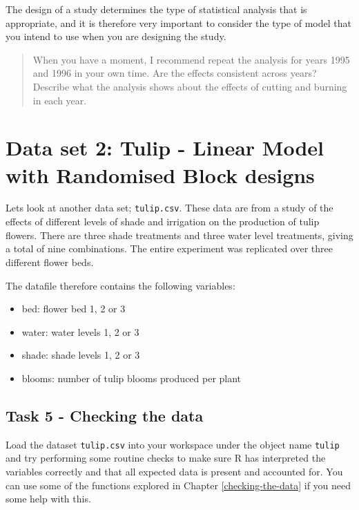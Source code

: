 \documentclass[
]{book}
\providecommand{\tightlist}{%
  \setlength{\itemsep}{0pt}\setlength{\parskip}{0pt}}
\begin{document}
The design of a study determines the type of statistical analysis that is appropriate, and it is therefore very important to consider the type of model that you intend to use when you are designing the study.

\begin{quote}
When you have a moment, I recommend repeat the analysis for years 1995 and 1996 in your own time.
Are the effects consistent across years? Describe what the analysis shows about the effects of cutting and burning in each year.
\end{quote}

\section{Data set 2: Tulip - Linear Model with Randomised Block designs}\label{data-set-2-tulip---linear-model-with-randomised-block-designs}

Lets look at another data set; \texttt{tulip.csv}. These data are from a study of the effects of different levels of shade and irrigation on the production of tulip flowers. There are three shade treatments and three water level treatments, giving a total of nine combinations. The entire experiment was replicated over three different flower beds.

The datafile therefore contains the following variables:

\begin{itemize}
\tightlist
\item
  bed: flower bed 1, 2 or 3
\item
  water: water levels 1, 2 or 3
\item
  shade: shade levels 1, 2 or 3
\item
  blooms: number of tulip blooms produced per plant
\end{itemize}

\subsection{Task 5 - Checking the data}\label{task-5---checking-the-data}

Load the dataset \texttt{tulip.csv} into your workspace under the object name \texttt{tulip} and try performing some routine checks to make sure R has interpreted the variables correctly and that all expected data is present and accounted for. You can use some of the functions explored in Chapter \ref{checking-the-data} if you need some help with this.
\end{document}
